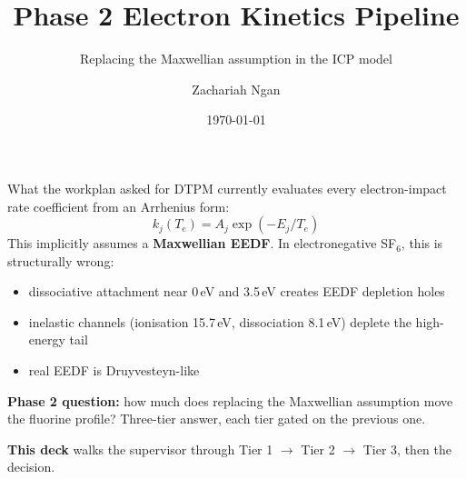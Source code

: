 \documentclass[10pt,aspectratio=169]{beamer}
\title{Phase 2 Electron Kinetics Pipeline}
\subtitle{Replacing the Maxwellian assumption in the \sfsix{} ICP model}
\author{Zachariah Ngan}
\institute{Illinois Plasma Institute}
\date{\today}
\newcommand{\sfsix}{SF$_6$}
\begin{document}
\begin{frame}
  \titlepage
\end{frame}

\begin{frame}{What the workplan asked for}
  \small
  DTPM currently evaluates every electron-impact rate coefficient from
  an Arrhenius form:
  \[
    k_j(T_e) = A_j \exp(-E_j / T_e)
  \]
  This implicitly assumes a \textbf{Maxwellian EEDF}. In electronegative
  \sfsix{}, this is structurally wrong:
  \begin{itemize}
    \item dissociative attachment near 0\,eV and 3.5\,eV creates
          EEDF depletion holes
    \item inelastic channels (ionisation 15.7\,eV, dissociation 8.1\,eV)
          deplete the high-energy tail
    \item real EEDF is Druyvesteyn-like
  \end{itemize}

  \vspace{0.3em}
  \textbf{Phase 2 question:} how much does replacing the Maxwellian
  assumption move the fluorine profile? Three-tier answer, each tier
  gated on the previous one.

  \vspace{0.3em}
  \textbf{This deck} walks the supervisor through Tier 1 $\to$
  Tier 2 $\to$ Tier 3, then the decision.
\end{frame}
\end{document}
